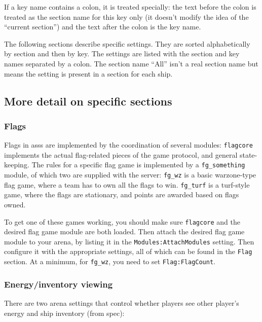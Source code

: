 \documentclass{article}
\newcommand{\asss}{asss}
\begin{document}
If a key name contains a colon, it is treated specially: the text before
the colon is treated as the section name for this key only (it doesn't
modify the idea of the ``current section'') and the text after the colon
is the key name.

The following sections describe specific settings. They are sorted
alphabetically by section and then by key. The settings are listed with
the section and key names separated by a colon. The section name ``All''
isn't a real section name but means the setting is present in a section
for each ship.



\subsection{More detail on specific sections}

\subsubsection{Flags}

Flags in \asss{} are implemented by the coordination of several modules:
\verb/flagcore/ implements the actual flag-related pieces of the game
protocol, and general state-keeping. The rules for a specific flag game
is implemented by a \verb/fg_something/ module, of which two are
supplied with the server: \verb/fg_wz/ is a basic warzone-type flag
game, where a team has to own all the flags to win. \verb/fg_turf/ is a
turf-style game, where the flags are stationary, and points are awarded
based on flags owned.

To get one of these games working, you should make sure \verb/flagcore/
and the desired flag game module are both loaded. Then attach the
desired flag game module to your arena, by listing it in the
\verb/Modules:AttachModules/ setting. Then configure it with the
appropriate settings, all of which can be found in the \verb/Flag/
section. At a minimum, for \verb/fg_wz/, you need to set
\verb/Flag:FlagCount/.


\subsubsection{Energy/inventory viewing}

There are two arena settings that control whether players see other
player's energy and ship inventory (from spec):
\end{document}
